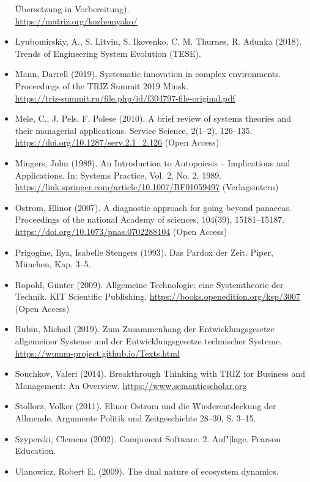 \documentclass[11pt,a4paper]{article}
\begin{document}
\begin{itemize}
  Übersetzung in Vorbereitung).\\ \url{https://matriz.org/kozhemyako/}
\item Lyubomirskiy, A., S. Litvin, S. Ikovenko, C. M. Thurnes, R. Adunka
  (2018).  Trends of Engineering System Evolution (TESE).
\item Mann, Darrell (2019).  Systematic innovation in complex
  environments. Proceedings of the TRIZ Summit 2019 Minsk.\\
  \url{https://triz-summit.ru/file.php/id/f304797-file-original.pdf} 
\item Mele, C., J. Pels, F. Polese (2010). A brief review of systems theories
  and their managerial applications. Service Science, 2(1--2), 126--135.\\
  \url{https://doi.org/10.1287/serv.2.1_2.126} (Open Access)
\item Mingers, John (1989). An Introduction to Autopoiesis -- Implications and
  Applications. In: Systems Practice, Vol. 2, No. 2, 1989.\\
  \url{https://link.springer.com/article/10.1007/BF01059497} (Verlagsintern) 
\item Ostrom, Elinor (2007). A diagnostic approach for going beyond panaceas.
  Proceedings of the national Academy of sciences, 104(39), 15181--15187.\\
  \url{https://doi.org/10.1073/pnas.0702288104} (Open Access)
\item Prigogine, Ilya, Isabelle Stengers (1993). Das Pardox der Zeit. Piper,
  München, Kap. 3--5.  
\item Ropohl, Günter (2009). Allgemeine Technologie: eine Systemtheorie der
  Technik.  KIT Scientific Publishing.
  \url{https://books.openedition.org/ksp/3007} (Open Access) 
\item Rubin, Michail (2019).  Zum Zusammenhang der Entwicklungsgesetze
  allgemeiner Systeme und der Entwicklungsgesetze technischer Systeme. \\
  \url{https://wumm-project.github.io/Texts.html} 
\item Souchkov, Valeri (2014). Breakthrough Thinking with TRIZ for Business
  and Management: An Overview. \url{https://www.semanticscholar.org}
\item Stollorz, Volker (2011). Elinor Ostrom und die Wiederentdeckung der
  Allmende. Argumente Politik und Zeitgeschichte 28--30, S. 3--15. 
\item Szyperski, Clemens (2002). Component Software. 2. Auf"|lage. Pearson
  Education. 
\item Ulanowicz, Robert E. (2009). The dual nature of ecosystem dynamics.

\end{itemize}
\end{document}
